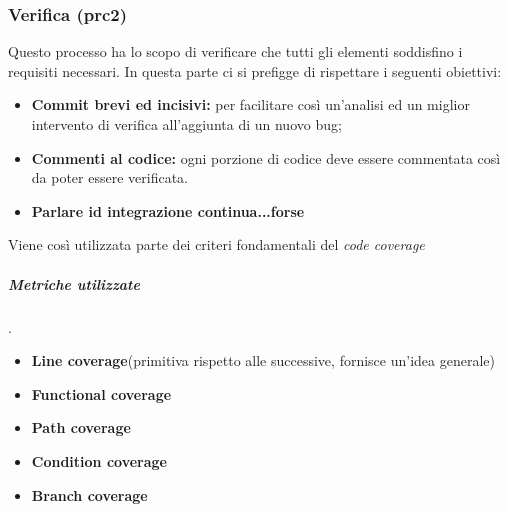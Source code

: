 \subsubsection{Verifica (prc2)}
Questo processo ha lo scopo di verificare che tutti gli elementi soddisfino i requisiti necessari. In questa parte ci si prefigge di rispettare i seguenti obiettivi:
\begin{itemize}
	\item{\textbf{Commit brevi ed incisivi:} per facilitare così un'analisi ed un miglior intervento di verifica all'aggiunta di un nuovo bug;}
	\item{\textbf{Commenti al codice:} ogni porzione di codice deve essere commentata così da poter essere verificata.}
	\item{\textbf{Parlare id integrazione continua...forse}}
\end{itemize}
Viene così utilizzata parte dei criteri fondamentali del \textit{code coverage}
\subparagraph{Metriche utilizzate}.
\begin{itemize}
	\item{\textbf{Line coverage}(primitiva rispetto alle successive, fornisce un'idea generale)}
	\item{\textbf{Functional coverage}}
	\item{\textbf{Path coverage}}
	\item{\textbf{Condition coverage}}
	\item{\textbf{Branch coverage}}
\end{itemize}
\begin{table}[!htpb]
	\centering
	\renewcommand{\arraystretch}{2} 
	\caption{TBD}
\end{table}
